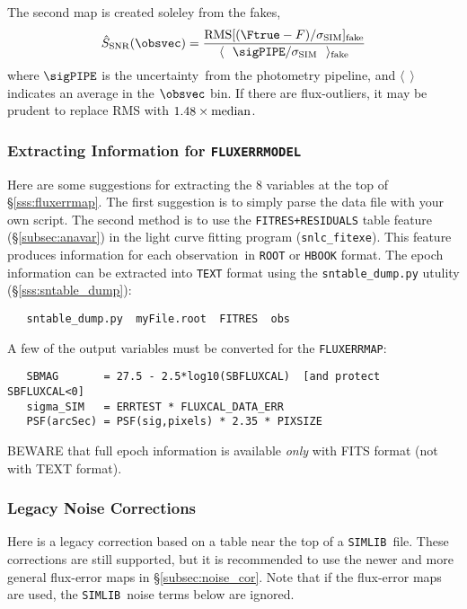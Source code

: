 \documentclass[12pt]{article}
\newcommand{\unc}{uncertainty}
\newcommand{\simlib}{{\tt SIMLIB}}
\newcommand{\obs}{observation}
\newcommand{\sigSIM}{\sigma_{\rm SIM}}
\newcommand{\SSNR}{\hat{S}_{\rm SNR}}
\begin{document}
{The second map is created soleley from the fakes,
%
\begin{equation}
  \SSNR(\obsvec) = 
       \frac{ {\rm RMS}[(\Ftrue-F)/\sigSIM ]_{\rm fake} }
            { \langle~~\sigPIPE/\sigSIM ~~\rangle_{\rm fake} }
   \label{eq:SSNRmap2}
\end{equation}
%
where $\sigPIPE$ is the \unc\ from the photometry pipeline,
and $\langle~~\rangle$ indicates an average in the $\obsvec$ bin.
If there are flux-outliers, it may be prudent to replace RMS
with $1.48\times {\rm median}$.

\subsubsection{Extracting Information for {\tt FLUXERRMODEL} }
\label{sss:fluxerrmap_info}

Here are some suggestions for extracting the 8 variables
at the top of \S\ref{sss:fluxerrmap}. The first suggestion
is to simply parse the data file with your own script.
The second method is to use the {\tt FITRES+RESIDUALS} table
feature (\S\ref{subsec:anavar}) 
in the light curve fitting program ({\tt snlc\_fitexe}).
This feature produces information
for each \obs\ in {\tt ROOT} or {\tt HBOOK} format.
The epoch information can be extracted into {\tt TEXT} format
using the {\tt sntable\_dump.py} utulity (\S\ref{sss:sntable_dump}):
\begin{verbatim}
   sntable_dump.py  myFile.root  FITRES  obs
\end{verbatim}
A few of the output variables must be converted for the
{\tt FLUXERRMAP}:
%
\begin{verbatim}
   SBMAG       = 27.5 - 2.5*log10(SBFLUXCAL)  [and protect SBFLUXCAL<0]
   sigma_SIM   = ERRTEST * FLUXCAL_DATA_ERR
   PSF(arcSec) = PSF(sig,pixels) * 2.35 * PIXSIZE
\end{verbatim}
%
BEWARE that full epoch information is available {\it only}
with FITS format (not with TEXT format).

\clearpage
\subsubsection{ Legacy Noise Corrections }
\label{sss:noise_cor_legacy}

Here is a legacy correction based on a table near the top
of a \simlib\ file. These corrections are still supported,
but it is recommended to use the newer and more general
flux-error maps in \S\ref{subsec:noise_cor}.
Note that if the flux-error maps are used, the \simlib\ noise
terms below are ignored.

}
\end{document}
